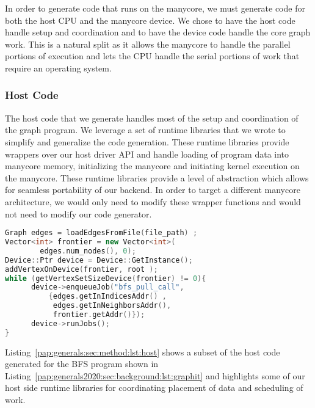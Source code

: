 In order to generate code that runs on the manycore, we must generate code for both the host CPU and the manycore device.
We chose to have the host code handle setup and coordination and to have the device code handle the core graph work.
This is a natural split as it allows the manycore to handle the parallel portions of execution and lets the CPU handle the serial portions of work that require an operating system.

\subsubsection{Host Code} 

The host code that we generate handles most of the setup and coordination of the graph program. 
We leverage a set of runtime libraries that we wrote to simplify and generalize the code generation. 
These runtime libraries provide wrappers over our host driver API and handle loading of program data into manycore memory, initializing the manycore and initiating kernel execution on the manycore. 
These runtime libraries provide a level of abstraction which allows for seamless portability of our backend. 
In order to target a different manycore architecture, we would only need to modify these wrapper functions and would not need to modify our code generator.
\newline
{}
\begin{lstlisting}[language=C++, breaklines=true, 
                   caption=Generated manycore host code for the Breadth-First Search (BFS) program shown in Listing~\ref{pap:generals2020:sec:background:lst:graphit}.,
                   label=pap:generals:sec:method:lst:host]
Graph edges = loadEdgesFromFile(file_path) ;
Vector<int> frontier = new Vector<int>(
        edges.num_nodes(), 0);
Device::Ptr device = Device::GetInstance();
addVertexOnDevice(frontier, root );
while (getVertexSetSizeDevice(frontier) != 0){
      device->enqueueJob("bfs_pull_call",
          {edges.getInIndicesAddr() , 
           edges.getInNeighborsAddr(), 
           frontier.getAddr()}); 
      device->runJobs();
}
\end{lstlisting}
Listing~\ref{pap:generals:sec:method:lst:host} shows a subset of the host code generated for the BFS program shown in Listing~\ref{pap:generals2020:sec:background:lst:graphit} and highlights some of our host side runtime libraries for coordinating placement of data and scheduling of work.

